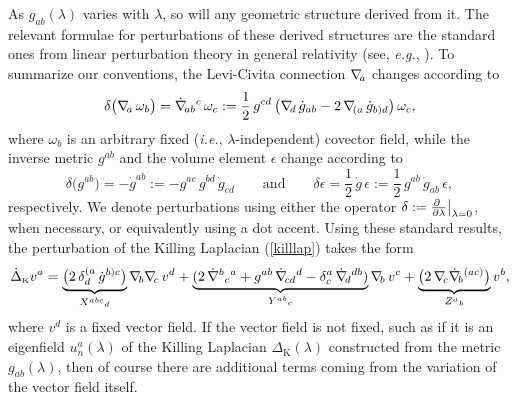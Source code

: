 \documentclass[12pt,letterpaper]{iopart}
\newcommand\Lap[1][K]{\Delta_{\scriptscriptstyle\mathrm{#1}}}
\newcommand\dLap[1][K]{\dot\Delta_{\scriptscriptstyle\mathrm{#1}}}
\begin{document}
As $g_{ab}(\lambda)$ varies with $\lambda$, so will any geometric structure derived from it.  The relevant formulae for perturbations of these derived structures are the standard ones from linear perturbation theory in general relativity (see, \textit{e.g.}, \cite{Wald}).  To summarize our conventions, the Levi-Civita connection $\nabla\!_a$ changes according to 
%
\begin{equation}\label{dConn}
	\delta \bigl( \nabla\!_a\, \omega_b \bigr) 
		= \dot{\nabla}\!_{ab}{}^c\, \omega_c 
		:= \frac{1}{2}\, g^{cd}\, \bigl( \nabla\!_d\, \dot g_{ab} - 2\, \nabla\!_{(a}\, \dot g_{b)d} \bigr)\, \omega_c, 
\end{equation}
%
where $\omega_b$ is an arbitrary fixed (\textit{i.e.}, $\lambda$-independent) covector field, while the inverse metric $g^{ab}$ and the volume element $\epsilon$ change according to 
%
\begin{equation}\label{dinvvol}
	\delta \bigl( g^{ab} \bigr) = - \dot g^{ab} := - g^{ac}\, g^{bd}\, \dot g_{cd}
	\qquad\text{and}\qquad
	\delta\epsilon = \frac{1}{2}\, \dot g\, \epsilon := \frac{1}{2}\, g^{ab}\, \dot g_{ab}\, \epsilon, 
\end{equation}
%
respectively.  We denote perturbations using either the operator $\delta := \pdby{\lambda} \bigr|_{\lambda = 0}$, when necessary, or equivalently using a dot accent.  Using these standard results, the perturbation of the Killing Laplacian (\ref{killlap}) takes the form 
%
\begin{equation}\label{dkilllap}
	\dLap v^a 
		= \underbrace{\bigl( 2\, \delta^{(a}_d\, \dot g^{b)c} \bigr)}_{X^{abc}{}_d} \grad\!_b \grad\!_c\, v^d
			+ \underbrace{( 2\, \dot\grad^b{}_c{}^a 
				+ g^{ab}\, \dot\grad\!_{cd}{}^d
				- \delta_c^a\, \dot\grad\!_d{}^{db} )}_{Y^{ab}{}_c} \grad\!_b\, v^c
			+ \underbrace{\bigl( 2\, \grad\!_c \dot\grad\!_b{}^{(ac)} \bigr)}_{Z^a{}_b{}} v^b, 
\end{equation}
%
where $v^d$ is a fixed vector field.  If the vector field is not fixed, such as if it is an eigenfield $u_n^a(\lambda)$ of the Killing Laplacian $\Lap(\lambda)$ constructed from the metric $g_{ab}(\lambda)$, then of course there are additional terms coming from the variation of the vector field itself.
\end{document}
